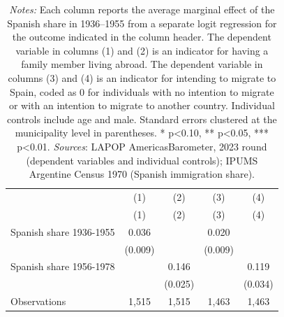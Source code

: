 \begin{table}[htbp]
\centering
\caption{Historical Spanish Exposure and Migration-Related Outcomes}
\begin{tabular}{l*{4}{c}}
\hline
            &\multicolumn{1}{c}{(1)}&\multicolumn{1}{c}{(2)}&\multicolumn{1}{c}{(3)}&\multicolumn{1}{c}{(4)}\\
            &\multicolumn{1}{c}{(1)}&\multicolumn{1}{c}{(2)}&\multicolumn{1}{c}{(3)}&\multicolumn{1}{c}{(4)}\\
\hline
Spanish share 1936-1955&       0.036\sym{***}&                     &       0.020\sym{**} &                     \\
            &     (0.009)         &                     &     (0.009)         &                     \\
[1em]
Spanish share 1956-1978&                     &       0.146\sym{***}&                     &       0.119\sym{***}\\
            &                     &     (0.025)         &                     &     (0.034)         \\
\hline
Observations&       1,515         &       1,515         &       1,463         &       1,463         \\
\hline
\end{tabular}
\captionsetup{justification = justified}
\caption*{\footnotesize \textit{Notes:} Each column reports the average marginal effect of the Spanish share in 1936–1955 from a separate logit regression for the outcome indicated in the column header. The dependent variable in columns (1) and (2) is an indicator for having a family member living abroad. The dependent variable in columns (3) and (4) is an indicator for intending to migrate to Spain, coded as 0 for individuals with no intention to migrate or with an intention to migrate to another country. Individual controls include age and male. Standard errors clustered at the municipality level in parentheses. * p<0.10, ** p<0.05, *** p<0.01. \textit{Sources}: LAPOP AmericasBarometer, 2023 round (dependent variables and individual controls); IPUMS Argentine Census 1970 (Spanish immigration share).}
\end{table}
